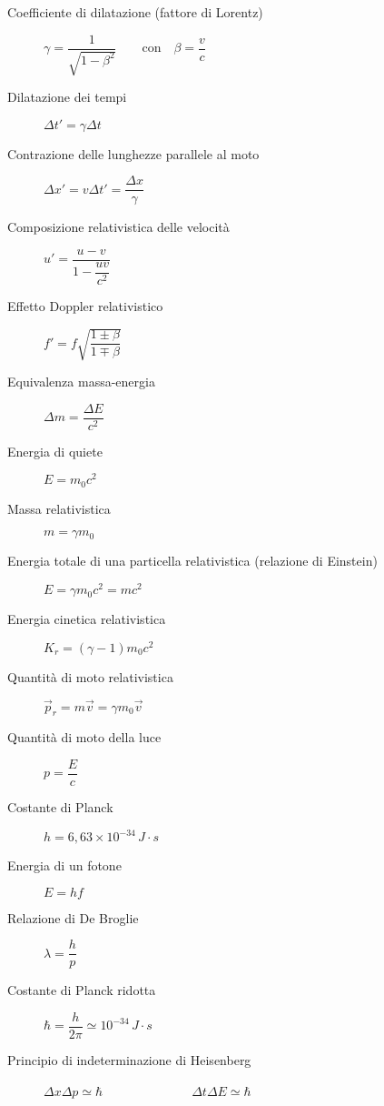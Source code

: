\documentclass[a4paper,11pt,italian]{article}
\begin{document}
\begin{description}
  
  \item[Coefficiente di dilatazione (fattore di Lorentz)]
  $ \gamma = \dfrac{1}{\sqrt{1-\beta^2}} \qquad \mathrm{con} \quad \beta = \dfrac{v}{c} $
  \item[Dilatazione dei tempi]
  $ \Delta t' = \gamma \Delta t $
  
  \item[Contrazione delle lunghezze parallele al moto] 
  $ \Delta x' = v \Delta t' = \dfrac{\Delta x}{\gamma} $
  
  \item[Composizione relativistica delle velocità]
  $ u' = \dfrac{u - v}{1- \dfrac{u v}{c^2}} $
  
  \item[Effetto Doppler relativistico] $ f' = f \sqrt{\dfrac{1 \pm \beta}{1 \mp \beta}} $
  
   \item[Equivalenza massa-energia] 
  $ \Delta m = \dfrac{\Delta E}{c^2} $
  
  \item[Energia di quiete]
  $ E = m_0 c^2 $
  
  \item[Massa relativistica]
  $ m = \gamma m_0 $
  
  \item[Energia totale di una particella relativistica (relazione di Einstein)]
  $ E = \gamma m_0 c^2 = mc^2$
  
  
  \item[Energia cinetica relativistica] 
  $ K_r = (\gamma -1) m_0 c^2 $
  \item[Quantità di moto relativistica] 
  $ \vec{p}_r = m \vec{v} = \gamma m_0 \vec{v} $
  \item[Quantità di moto della luce] 
  $ p = \dfrac{E}{c} $
  
  \item[Costante di Planck]
  $ h = 6,63 \times 10^{-34} \, J\cdot s $
  
  \item[Energia di un fotone] $ E=hf $  
  
  \item[Relazione di De Broglie] 
  $ \lambda = \dfrac{h}{p} $
  
  
  \item[Costante di Planck ridotta] 
  $ \hbar = \dfrac{h}{2 \pi} \simeq 10^{-34} \, J\cdot s $
  
  \item[Principio di indeterminazione di Heisenberg] $ \Delta x \Delta p \simeq \hbar $~~~~~~~~~~~~~~$ \Delta t \Delta E \simeq \hbar $
  
\end{description}
   
\end{document}
